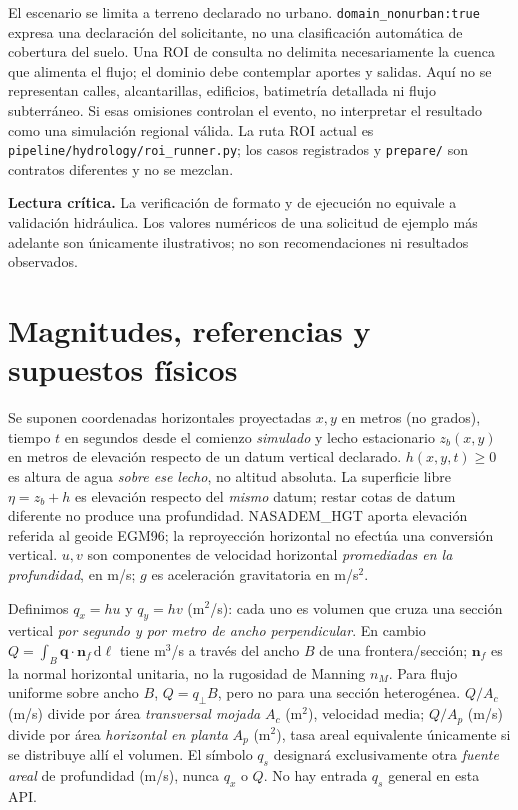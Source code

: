 \documentclass[11pt,a4paper]{article}
\newcommand{\src}[1]{\nolinkurl{#1}}
\newcommand{\dd}{\mathrm d}
\newcommand{\warn}[1]{\par\noindent\colorbox{blue!8}{\parbox{.965\linewidth}{\textbf{Lectura crítica.} #1}}\par}
\begin{document}
El escenario se limita a terreno declarado no urbano. \texttt{domain\_nonurban:true} expresa una declaración del solicitante, no una clasificación automática de cobertura del suelo. Una ROI de consulta no delimita necesariamente la cuenca que alimenta el flujo; el dominio debe contemplar aportes y salidas. Aquí no se representan calles, alcantarillas, edificios, batimetría detallada ni flujo subterráneo. Si esas omisiones controlan el evento, no interpretar el resultado como una simulación regional válida. La ruta ROI actual es \src{pipeline/hydrology/roi_runner.py}; los casos registrados y \texttt{prepare/} son contratos diferentes y no se mezclan.

\warn{La verificación de formato y de ejecución no equivale a validación hidráulica. Los valores numéricos de una solicitud de ejemplo más adelante son únicamente ilustrativos; no son recomendaciones ni resultados observados.}

\section{Magnitudes, referencias y supuestos físicos}
\label{sec:simbolos}
Se suponen coordenadas horizontales proyectadas $x,y$ en metros (no grados), tiempo $t$ en segundos desde el comienzo \emph{simulado} y lecho estacionario $z_b(x,y)$ en metros de elevación respecto de un datum vertical declarado. $h(x,y,t)\geq0$ es altura de agua \emph{sobre ese lecho}, no altitud absoluta. La superficie libre $\eta=z_b+h$ es elevación respecto del \emph{mismo} datum; restar cotas de datum diferente no produce una profundidad. NASADEM\_HGT aporta elevación referida al geoide EGM96; la reproyección horizontal no efectúa una conversión vertical. $u,v$ son componentes de velocidad horizontal \emph{promediadas en la profundidad}, en m/s; $g$ es aceleración gravitatoria en m/s$^2$.

Definimos $q_x=hu$ y $q_y=hv$ (m$^2$/s): cada uno es volumen que cruza una sección vertical \emph{por segundo y por metro de ancho perpendicular}. En cambio $Q=\int_B\boldsymbol q\cdot\boldsymbol n_{\!f}\,\dd\ell$ tiene m$^3$/s a través del ancho $B$ de una frontera/sección; $\boldsymbol n_{\!f}$ es la normal horizontal unitaria, no la rugosidad de Manning $n_M$. Para flujo uniforme sobre ancho $B$, $Q=q_{\perp}B$, pero no para una sección heterogénea. $Q/A_c$ (m/s) divide por área \emph{transversal mojada} $A_c$ (m$^2$), velocidad media; $Q/A_p$ (m/s) divide por área \emph{horizontal en planta} $A_p$ (m$^2$), tasa areal equivalente únicamente si se distribuye allí el volumen. El símbolo $q_s$ designará exclusivamente otra \emph{fuente areal} de profundidad (m/s), nunca $q_x$ o $Q$. No hay entrada $q_s$ general en esta API.
\end{document}
